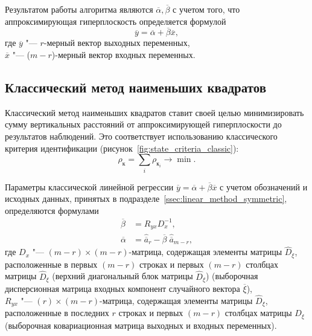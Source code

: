 Результатом работы алгоритма являются \( \overline{\alpha}, \overline{\beta} \) с учетом того,
что аппроксимирующая гиперплоскость определяется формулой
\[ \overline{y} = \overline{\alpha} + \overline{\beta} \overline{x}, \]
где \( \overline{y} \) "--- \( r \)-мерный вектор выходных переменных, \\
\hspace*{7mm} \( \overline{x} \) "--- (\( m - r \))-мерный вектор входных переменных.

\vspace{2\baselineskip}
\subsection{Классический метод наименьших квадратов}\label{ssec:linear_method_classic}

Классический метод наименьших квадратов ставит своей целью минимизировать сумму
вертикальных расстояний от аппроксимирующей гиперплоскости до результатов наблюдений.
Это соответствует использованию классического критерия идентификации
(рисунок~\ref{fig:state_criteria_classic}):
\begin{equation*}
  \rho_{\text{к}} = \sum_i \rho_{\text{к}_i} \rightarrow \min.
\end{equation*}

Параметры классической линейной регрессии
\( \overline{y} = \overline{\alpha} + \overline{\beta} \overline{x} \)
с учетом обозначений и исходных данных, принятых в подразделе~\ref{ssec:linear_method_symmetric},
определяются формулами
\begin{equation*}
  \begin{aligned}
    \overline{\beta} &= R_{yx} D^{-1}_{x}, \\
    \overline{\alpha} &= \hat{\overline{a}}_{r} - \overline{\beta} \; \hat{\overline{a}}_{m-r},
  \end{aligned}
\end{equation*}
где \( D_x \) "--- \( (m-r) \times (m-r) \)-матрица, содержащая элементы матрицы \( \hat{D}_{\xi} \),
расположенные в первых \( (m-r) \) строках и первых \( (m-r) \) столбцах матрицы \( \hat{D}_{\xi} \)
(верхний диагональный блок матрицы \( \hat{D}_{\xi} \))
(выборочная дисперсионная матрица входных компонент случайного вектора \( \overline{\xi} \)), \\
\hspace*{7mm} \( R_{yx} \) "--- \( (r) \times (m-r) \)-матрица, содержащая элементы матрицы
\( \hat{D}_{\xi} \), расположенные в последних \( r \) строках и первых \( (m-r) \) столбцах
матрицы \( D_{\xi} \) (выборочная ковариационная матрица выходных и входных переменных).

